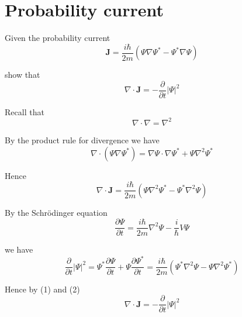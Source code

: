 

\section*{Probability current}

Given the probability current
\begin{equation*}
\mathbf J=\frac{i\hbar}{2m}\left(\Psi\nabla\Psi^*-\Psi^*\nabla\Psi\right)
\end{equation*}

show that
\begin{equation*}
\nabla\cdot\mathbf J=-\frac{\partial}{\partial t}|\Psi|^2
\end{equation*}

Recall that
\begin{equation*}
\nabla\cdot\nabla=\nabla^2
\end{equation*}

By the product rule for divergence we have
\begin{equation*}
\nabla\cdot(\Psi\nabla\Psi^*)
=\nabla\Psi\cdot\nabla\Psi^*+\Psi\nabla^2\Psi^*
\end{equation*}

Hence
\begin{equation*}
\nabla\cdot\mathbf J
=\frac{i\hbar}{2m}\left(\Psi\nabla^2\Psi^*-\Psi^*\nabla^2\Psi\right)
\tag{1}
\end{equation*}

By the Schr\"odinger equation
\begin{equation*}
\frac{\partial\Psi}{\partial t}
=\frac{i\hbar}{2m}\nabla^2\Psi-\frac{i}{\hbar}V\Psi
\end{equation*}

we have
\begin{equation*}
\frac{\partial}{\partial t}|\Psi|^2
=\Psi^*\frac{\partial\Psi}{\partial t}+\Psi\frac{\partial\Psi^*}{\partial t}
=\frac{i\hbar}{2m}\left(\Psi^*\nabla^2\Psi-\Psi\nabla^2\Psi^*\right)
\tag{2}
\end{equation*}

Hence by (1) and (2)
\begin{equation*}
\nabla\cdot\mathbf J=-\frac{\partial}{\partial t}|\Psi|^2
\end{equation*}


